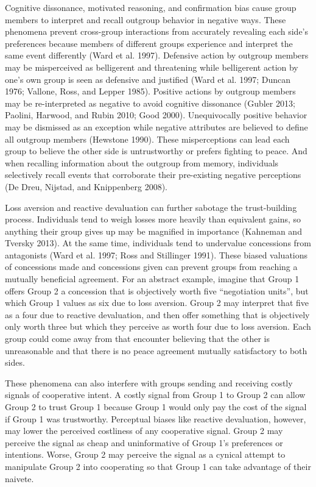 \documentclass[11pt]{article}
\begin{document}
Cognitive dissonance, motivated reasoning, and confirmation bias cause
group members to interpret and recall outgroup behavior in negative
ways. These phenomena prevent cross-group interactions from accurately
revealing each side's preferences because members of different groups
experience and interpret the same event differently (Ward et al. 1997).
Defensive action by outgroup members may be misperceived as belligerent
and threatening while belligerent action by one's own group is seen as
defensive and justified (Ward et al. 1997; Duncan 1976; Vallone, Ross,
and Lepper 1985). Positive actions by outgroup members may be
re-interpreted as negative to avoid cognitive dissonance (Gubler 2013;
Paolini, Harwood, and Rubin 2010; Good 2000). Unequivocally positive
behavior may be dismissed as an exception while negative attributes are
believed to define all outgroup members (Hewstone 1990). These
misperceptions can lead each group to believe the other side is
untrustworthy or prefers fighting to peace. And when recalling
information about the outgroup from memory, individuals selectively
recall events that corroborate their pre-existing negative perceptions
(De Dreu, Nijstad, and Knippenberg 2008).

Loss aversion and reactive devaluation can further sabotage the
trust-building process. Individuals tend to weigh losses more heavily
than equivalent gains, so anything their group gives up may be magnified
in importance (Kahneman and Tversky 2013). At the same time, individuals
tend to undervalue concessions from antagonists (Ward et al. 1997; Ross
and Stillinger 1991). These biased valuations of concessions made and
concessions given can prevent groups from reaching a mutually beneficial
agreement. For an abstract example, imagine that Group 1 offers Group 2
a concession that is objectively worth five ``negotiation units'', but
which Group 1 values as six due to loss aversion. Group 2 may interpret
that five as a four due to reactive devaluation, and then offer
something that is objectively only worth three but which they perceive
as worth four due to loss aversion. Each group could come away from that
encounter believing that the other is unreasonable and that there is no
peace agreement mutually satisfactory to both sides.

These phenomena can also interfere with groups sending and receiving
costly signals of cooperative intent. A costly signal from Group 1 to
Group 2 can allow Group 2 to trust Group 1 because Group 1 would only
pay the cost of the signal if Group 1 was trustworthy. Perceptual biases
like reactive devaluation, however, may lower the perceived costliness
of any cooperative signal. Group 2 may perceive the signal as cheap and
uninformative of Group 1's preferences or intentions. Worse, Group 2 may
perceive the signal as a cynical attempt to manipulate Group 2 into
cooperating so that Group 1 can take advantage of their naivete.
\end{document}
